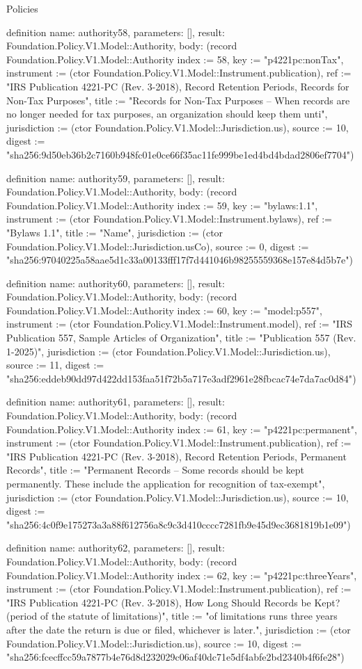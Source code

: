 \begin{lexlean}{Policies}
\begin{semanticmodule}
definition{
  name: authority58,
  parameters: [],
  result: Foundation.Policy.V1.Model::Authority,
  body: (record Foundation.Policy.V1.Model::Authority {index := 58, key := "p4221pc:nonTax", instrument := (ctor Foundation.Policy.V1.Model::Instrument.publication), ref := "IRS Publication 4221-PC (Rev. 3-2018), Record Retention Periods, Records for Non-Tax Purposes", title := "Records for Non-Tax Purposes – When records are no longer needed for tax purposes, an organization should keep them unti", jurisdiction := (ctor Foundation.Policy.V1.Model::Jurisdiction.us), source := 10, digest := "sha256:9d50eb36b2c7160b948fc01e0ce66f35ac11fe999be1ed4bd4bdad2806ef7704"})
}

definition{
  name: authority59,
  parameters: [],
  result: Foundation.Policy.V1.Model::Authority,
  body: (record Foundation.Policy.V1.Model::Authority {index := 59, key := "bylaws:1.1", instrument := (ctor Foundation.Policy.V1.Model::Instrument.bylaws), ref := "Bylaws 1.1", title := "Name", jurisdiction := (ctor Foundation.Policy.V1.Model::Jurisdiction.usCo), source := 0, digest := "sha256:97040225a58aae5d1c33a00133fff17f7d441046b98255559368e157e84d5b7e"})
}

definition{
  name: authority60,
  parameters: [],
  result: Foundation.Policy.V1.Model::Authority,
  body: (record Foundation.Policy.V1.Model::Authority {index := 60, key := "model:p557", instrument := (ctor Foundation.Policy.V1.Model::Instrument.model), ref := "IRS Publication 557, Sample Articles of Organization", title := "Publication 557 (Rev. 1-2025)", jurisdiction := (ctor Foundation.Policy.V1.Model::Jurisdiction.us), source := 11, digest := "sha256:eddeb90dd97d422dd153faa51f72b5a717e3adf2961e28fbcac74e7da7ac0d84"})
}

definition{
  name: authority61,
  parameters: [],
  result: Foundation.Policy.V1.Model::Authority,
  body: (record Foundation.Policy.V1.Model::Authority {index := 61, key := "p4221pc:permanent", instrument := (ctor Foundation.Policy.V1.Model::Instrument.publication), ref := "IRS Publication 4221-PC (Rev. 3-2018), Record Retention Periods, Permanent Records", title := "Permanent Records – Some records should be kept permanently. These include the application for recognition of tax-exempt", jurisdiction := (ctor Foundation.Policy.V1.Model::Jurisdiction.us), source := 10, digest := "sha256:4c0f9e175273a3a88f612756a8c9c3d410cccc7281fb9e45d9ec3681819b1e09"})
}

definition{
  name: authority62,
  parameters: [],
  result: Foundation.Policy.V1.Model::Authority,
  body: (record Foundation.Policy.V1.Model::Authority {index := 62, key := "p4221pc:threeYears", instrument := (ctor Foundation.Policy.V1.Model::Instrument.publication), ref := "IRS Publication 4221-PC (Rev. 3-2018), How Long Should Records be Kept? (period of the statute of limitations)", title := "of limitations runs three years after the date the return is due or filed, whichever is later.", jurisdiction := (ctor Foundation.Policy.V1.Model::Jurisdiction.us), source := 10, digest := "sha256:fcecffcc59a7877b4e76d8d232029c06af40dc71e5df4abfe2bd2340b4f6fe28"})
}


\end{semanticmodule}
\end{lexlean}
